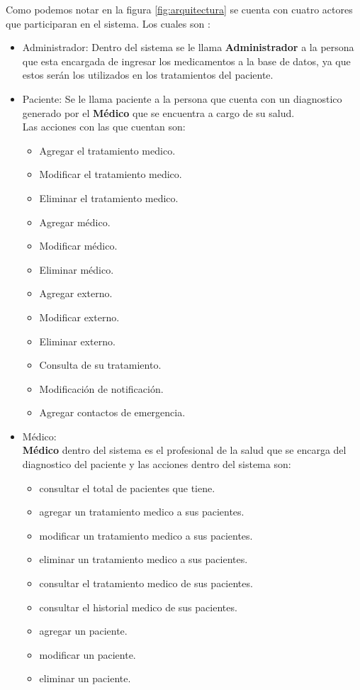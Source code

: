 Como podemos notar en la figura \ref{fig:arquitectura} se cuenta con cuatro actores que participaran en el sistema. Los cuales son :
\begin{itemize}
	\item Administrador: Dentro del sistema se le llama \textbf{Administrador} a la persona que esta encargada de ingresar los medicamentos a la base de datos, ya que estos serán los utilizados en los tratamientos del paciente.
	
	\item Paciente: Se le llama paciente a la persona que cuenta con un diagnostico generado por el \textbf{Médico} que se encuentra a cargo de su salud.\\
	Las acciones con las que cuentan son:
	\begin{itemize}
		\item Agregar el tratamiento medico.
		\item Modificar el tratamiento medico.
		\item Eliminar el tratamiento medico.
		\item Agregar médico.
		\item Modificar médico.
		\item Eliminar médico.
		\item Agregar externo.
		\item Modificar externo.
		\item Eliminar externo.
		\item Consulta de su tratamiento.
		\item Modificación de notificación.
		\item Agregar contactos de emergencia.
	\end{itemize}

	\item Médico: \\ \textbf{Médico} dentro del sistema es el profesional de la salud que se encarga del diagnostico del paciente y las acciones dentro del sistema son:
		\begin{itemize}
			\item consultar el total de pacientes que tiene.
			\item agregar un tratamiento medico a sus pacientes.
			\item modificar un tratamiento medico a sus pacientes.
			\item eliminar un tratamiento medico a sus pacientes.
			\item consultar el tratamiento medico de sus pacientes.
			\item consultar el historial medico de sus pacientes.
			\item agregar un paciente.
			\item modificar un paciente.
			\item eliminar un paciente.
		\end{itemize}


\end{itemize}
